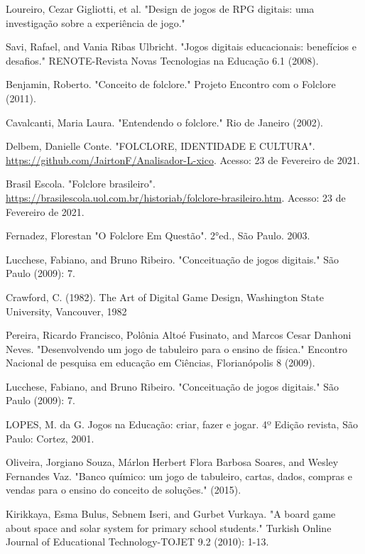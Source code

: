 \documentclass[12pt]{article}
\begin{document}
\begin{thebibliography}{1}

Loureiro, Cezar Gigliotti, et al. "Design de jogos de RPG digitais: uma investigação sobre a experiência de jogo."

Savi, Rafael, and Vania Ribas Ulbricht. "Jogos digitais educacionais: benefícios e desafios." RENOTE-Revista Novas Tecnologias na Educação 6.1 (2008).

Benjamin, Roberto. "Conceito de folclore." Projeto Encontro com o Folclore (2011).

Cavalcanti, Maria Laura. "Entendendo o folclore." Rio de Janeiro (2002).

Delbem, Danielle Conte. "FOLCLORE, IDENTIDADE E CULTURA". 
    \url{https://github.com/JairtonF/Analisador-L-xico}. Acesso: 23 de Fevereiro de 2021.

Brasil Escola. "Folclore brasileiro". 
    \url{https://brasilescola.uol.com.br/historiab/folclore-brasileiro.htm}. Acesso: 23 de Fevereiro de 2021.

Fernadez, Florestan "O Folclore Em Questão". 2°ed., São Paulo. 2003.

Lucchese, Fabiano, and Bruno Ribeiro. "Conceituação de jogos digitais." São Paulo (2009): 7.

Crawford, C. (1982). The Art of Digital Game Design, Washington State University, Vancouver, 1982

Pereira, Ricardo Francisco, Polônia Altoé Fusinato, and Marcos Cesar Danhoni Neves. "Desenvolvendo um jogo de tabuleiro para o ensino de física." Encontro Nacional de pesquisa em educação em Ciências, Florianópolis 8 (2009).

Lucchese, Fabiano, and Bruno Ribeiro. "Conceituação de jogos digitais." São Paulo (2009): 7.

LOPES, M. da G. Jogos na Educação: criar, fazer e jogar. 4º Edição revista, São Paulo: Cortez, 2001.

Oliveira, Jorgiano Souza, Márlon Herbert Flora Barbosa Soares, and Wesley Fernandes Vaz. "Banco químico: um jogo de tabuleiro, cartas, dados, compras e vendas para o ensino do conceito de soluções." (2015).

Kirikkaya, Esma Bulus, Sebnem Iseri, and Gurbet Vurkaya. "A board game about space and solar system for primary school students." Turkish Online Journal of Educational Technology-TOJET 9.2 (2010): 1-13.


\end{thebibliography}
\end{document}
